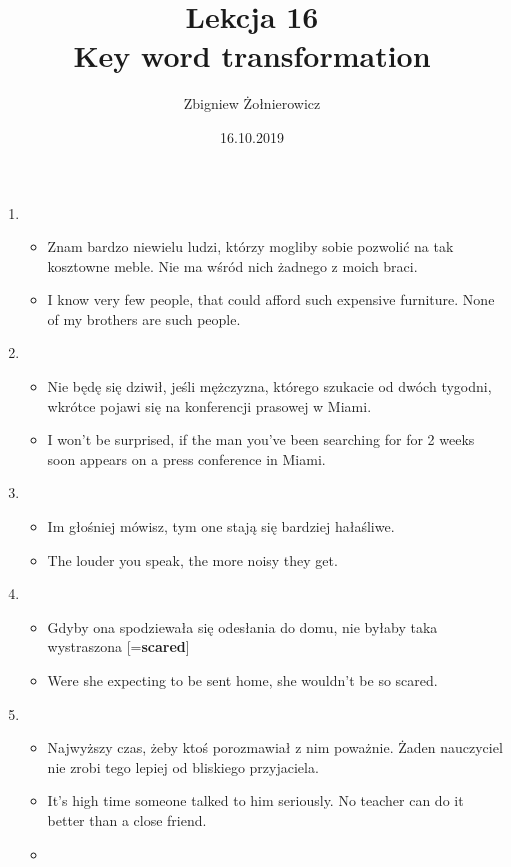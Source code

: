 \documentclass[a4paper]{article}
\begin{document}
\title{{\huge Lekcja 16} \\
{\large Key word transformation}}
\author{Zbigniew Żołnierowicz}
\date{16.10.2019}
\maketitle
\begin{enumerate}
    \item \begin{itemize}
        \item Znam bardzo niewielu ludzi, którzy mogliby sobie pozwolić na tak kosztowne meble. Nie ma wśród nich żadnego z moich braci.
        \item I know very few people, that could afford such expensive furniture. None of my brothers are such people.
    \end{itemize}
    \item \begin{itemize}
        \item Nie będę się dziwił, jeśli mężczyzna, którego szukacie od dwóch tygodni, wkrótce pojawi się na konferencji prasowej w Miami.
        \item I won't be surprised, if the man you've been searching for for 2 weeks soon appears on a press conference in Miami.
    \end{itemize}
    \item \begin{itemize}
        \item Im głośniej mówisz, tym one stają się bardziej hałaśliwe.
        \item The louder you speak, the more noisy they get.
    \end{itemize}
    \item \begin{itemize}
        \item Gdyby ona spodziewała się odesłania do domu, nie byłaby taka wystraszona [={\bf scared}]
        \item Were she expecting to be sent home, she wouldn't be so scared.
    \end{itemize}
    \item \begin{itemize}
        \item Najwyższy czas, żeby ktoś porozmawiał z nim poważnie. Żaden nauczyciel nie zrobi tego lepiej od bliskiego przyjaciela.
        \item It's high time someone talked to him seriously. No teacher can do it better than a close friend.        \item 

\end{itemize}
\end{enumerate}
\end{document}
